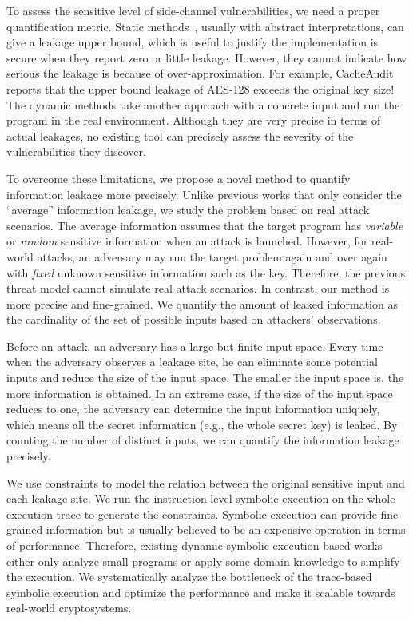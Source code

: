 To assess the sensitive level of side-channel vulnerabilities, we need a proper
quantification metric. Static methods~\cite{182946,5207642}, usually with
abstract interpretations, can give a leakage upper bound, which is useful to
justify the implementation is secure when they report zero or little leakage.
However, they cannot indicate how serious the leakage is because of
over-approximation. For example, CacheAudit~\cite{182946} reports that the upper
bound leakage of AES-128 exceeds the original key size! The dynamic methods take
another approach with a concrete input and run the program in the real
environment. Although they are very precise in terms of actual leakages, no
existing tool can precisely assess the severity of the vulnerabilities they
discover. 

To overcome these limitations, we propose a novel method to quantify information
leakage more precisely. Unlike previous works that only consider the
``average'' information leakage, we study the problem based on real attack
scenarios. The average information assumes that the target program has
\emph{variable} or \emph{random} sensitive information when an attack is
launched. However, for real-world attacks, an adversary may run the target
problem again and over again with \emph{fixed} unknown sensitive information
such as the key. Therefore, the previous threat model cannot simulate real attack
scenarios. In contrast, our method is more precise and fine-grained. We quantify
the amount of leaked information as the cardinality of the set of possible
inputs based on attackers' observations.


Before an attack, an adversary has a large but finite input space. Every time
when the adversary observes a leakage site, he can eliminate some potential
inputs and reduce the size of the input space. The smaller the input space is,
the more information is obtained. In an extreme case, if the size of the
input space reduces to one, the adversary can determine the input information
uniquely, which means all the secret information (e.g., the whole secret key) is
leaked. By counting the number of distinct inputs, we can quantify the
information leakage precisely.

We use constraints to model the relation between the original sensitive input
and each leakage site. We run the instruction level symbolic execution on the
whole execution trace to generate the constraints. Symbolic execution can
provide fine-grained information but is usually believed to be an expensive
operation in terms of performance. Therefore, existing dynamic symbolic
execution based works~\cite{203878,236338,Brotzman19Casym} either only analyze
small programs or apply some domain knowledge to simplify the execution. We
systematically analyze the bottleneck of the trace-based 
symbolic execution and optimize the performance and make it scalable
towards real-world cryptosystems.

